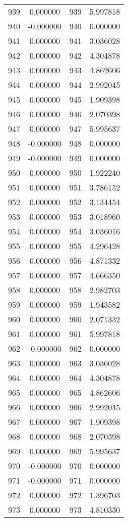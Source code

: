 \documentclass[12pt]{article}
\begin{document}
\begin{longtable}{@{}cccc@{}}
939 & 0.000000 & 939 & 5.997818 \\
940 & -0.000000 & 940 & 0.000000 \\
941 & 0.000000 & 941 & 3.036028 \\
942 & 0.000000 & 942 & 4.304878 \\
943 & 0.000000 & 943 & 4.862606 \\
944 & 0.000000 & 944 & 2.992045 \\
945 & 0.000000 & 945 & 1.909398 \\
946 & 0.000000 & 946 & 2.070398 \\
947 & 0.000000 & 947 & 5.995637 \\
948 & -0.000000 & 948 & 0.000000 \\
949 & -0.000000 & 949 & 0.000000 \\
950 & 0.000000 & 950 & 1.922240 \\
951 & 0.000000 & 951 & 3.786152 \\
952 & 0.000000 & 952 & 3.134454 \\
953 & 0.000000 & 953 & 3.018960 \\
954 & 0.000000 & 954 & 3.036016 \\
955 & 0.000000 & 955 & 4.296428 \\
956 & 0.000000 & 956 & 4.871332 \\
957 & 0.000000 & 957 & 4.666350 \\
958 & 0.000000 & 958 & 2.982703 \\
959 & 0.000000 & 959 & 1.943582 \\
960 & 0.000000 & 960 & 2.071332 \\
961 & 0.000000 & 961 & 5.997818 \\
962 & -0.000000 & 962 & 0.000000 \\
963 & 0.000000 & 963 & 3.036028 \\
964 & 0.000000 & 964 & 4.304878 \\
965 & 0.000000 & 965 & 4.862606 \\
966 & 0.000000 & 966 & 2.992045 \\
967 & 0.000000 & 967 & 1.909398 \\
968 & 0.000000 & 968 & 2.070398 \\
969 & 0.000000 & 969 & 5.995637 \\
970 & -0.000000 & 970 & 0.000000 \\
971 & -0.000000 & 971 & 0.000000 \\
972 & 0.000000 & 972 & 1.396703 \\
973 & 0.000000 & 973 & 4.810330 \\

\end{longtable}
\end{document}
